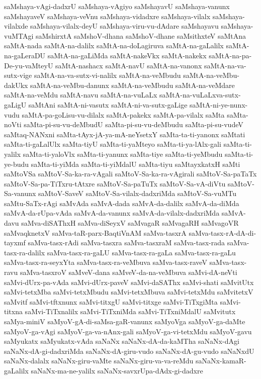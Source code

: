 {saMshaya-vAgi-dadxrU
saMshaya-vAgiyo
saMshayavU
saMshaya-vanunx
saMshayaveV
saMshaya-veVnu
saMshaya-vidadxre
saMshaya-vilalx
saMshaya-vilalxde
saMshaya-vilalx-deyU
saMshaya-viru-vu-dAdare
saMshayavu
saMshaya-vuMTAgi
saMshirxtA
saMshoV-dhana
saMshoV-dhane
saMsithxteV
saMtAna
saMtA-nada
saMtA-na-dalilx
saMtA-na-doLagiruva
saMtA-na-gaLalilx
saMtA-na-gaLeraDU
saMtA-na-gaLiMda
saMtA-nakeVkx
saMtA-nakekx
saMtA-na-pa-De-yu-vaMteyU
saMtA-nashacx
saMtA-navU
saMtA-na-vanonx
saMtA-na-va-sutx-vige
saMtA-na-va-sutx-vi-nalilx
saMtA-na-veMbudu
saMtA-na-veMbu-dakUkx
saMtA-na-veMbu-danunx
saMtA-na-veMbudu
saMtA-na-veMdare
saMtA-na-veMdu
saMtA-navu
saMtA-na-vuLaLx
saMtA-na-vuLaLxva-sutx-gaLigU
saMtAni
saMtA-ni-vasutx
saMtA-ni-va-sutx-gaLige
saMtA-ni-ye-nunx-vudu
saMtA-pa-goLisu-vu-dilalx
saMtA-pakekx
saMtA-pa-vilalx
saMta
saMta-noVti
saMta-pi-su-vu-deMbudU
saMta-pi-su-vu-deMbudu
saMta-pi-su-vudeV
saMtaq-NANxni
saMta-tAyx-jA-ya-mA-neYsetxY
saMta-ta-ti-yanonx
saMtati
saMta-ti-gaLalUlx
saMta-tiyU
saMta-ti-yaMteyo
saMta-ti-ya-lAlx-gali
saMta-ti-yalilx
saMta-ti-yaloVlx
saMta-ti-yanunx
saMta-tiye
saMta-ti-yeMbudu
saMta-ti-ye-budu
saMta-ti-yiMda
saMta-ti-yiMdalU
saMta-tiyu
saMtayxkatxH
saMti
saMtoVSa
saMtoV-Sa-ka-ra-vAgali
saMtoV-Sa-ka-ra-vAgirali
saMtoV-Sa-paTaTx
saMtoV-Sa-pa-TiTxru-tAtxre
saMtoV-Sa-paTuTx
saMtoV-Sa-vA-diVtu
saMtoV-Sa-vanunx
saMtoV-SaveV
saMtoV-Sa-vilalx-dadxriMda
saMtoV-Sa-vuMTu
saMtu-SaTx-rAgi
saMvAda
saMvA-dada
saMvA-da-dalilx
saMvA-da-diMda
saMvA-da-rUpa-vAda
saMvA-da-vanunx
saMvA-da-vilalx-dadxriMda
saMvA-davu
saMva-diSAThxH
saMva-diSeyxV
saMvagaR
saMvagaRH
saMvagoVR
saMvaqknetxV
saMva-taR-parx-BaqtiVnAM
saMva-tasxrA
saMva-tasx-rA-dA-di-tayxmf
saMva-tasx-rAdi
saMva-tasxra
saMva-tasxraM
saMva-tasx-rada
saMva-tasx-ra-dalilx
saMva-tasx-ra-gaLU
saMva-tasx-ra-gaLa
saMva-tasx-ra-gaLu
saMva-tasx-ra-seyxYta
saMva-tasx-ra-veMbuva
saMva-tasx-raveV
saMva-tasx-ravu
saMva-tasxroV
saMveV-dana
saMveV-da-na-veMbuva
saMvi-dA-neVti
saMvi-dUrx-pa-vAda
saMvi-dUrx-paveV
saMvi-daSAThx
saMvi-shati
saMvitUtx
saMvi-tetxMba
saMvi-tetxMbudu
saMvi-tetxMbuva
saMvi-tetxMdu
saMvitetxV
saMvitf
saMvi-tftxnunx
saMvi-titxgU
saMvi-titxge
saMvi-TiTxgiMta
saMvi-titxna
saMvi-TiTxnalilx
saMvi-TiTxniMda
saMvi-TiTxniMdalU
saMvitutx
saMya-miniV
saMyoV-gA-di-saMsa-gaR-vanunx
saMyoVga
saMyoV-ga-daMte
saMyoV-ga-vAgi
saMyoV-ga-va-nAnx-gali
saMyoV-ga-vi-tetxMdu
saMyoV-gavu
saMyukatx
saMyukatx-vAda
saNaNx
saNaNx-dA-da-kaMTha
saNaNx-dAgi
saNaNx-dA-gi-dadxriMda
saNaNx-dA-giru-vudo
saNaNx-dA-gu-vudo
saNaNxdU
saNaNx-dalalx
saNaNx-giru-vaMte
saNaNx-giru-va-va-reMdu
saNaNx-kamaR-gaLalilx
saNaNx-ma-ne-yalilx
saNaNx-savxrUpa-dAdx-gi-dadxre
}
